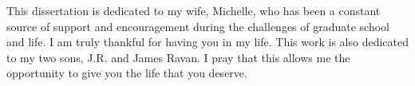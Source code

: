 This dissertation is dedicated to my wife, Michelle, who has been a constant source of support and encouragement during the challenges of graduate school and life. I am truly thankful for having you in my life. This work is also dedicated to my two sons, J.R. and James Ravan. I pray that this allows me the opportunity to give you the life that you deserve.